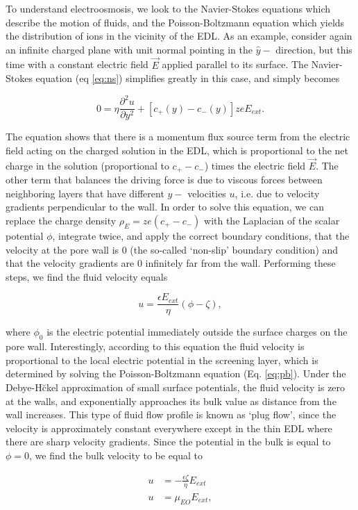 			To understand electroosmosis, we look to the Navier-Stokes equations which describe the motion of fluids, and the Poisson-Boltzmann equation which yields the distribution of ions in the vicinity of the EDL. As an example, consider again an infinite charged plane with unit normal pointing in the $\hat{y}-$ direction, but this time with a constant electric field $\vec{E}$ applied parallel to its surface. The Navier-Stokes equation (eq \ref{eq:ns}) simplifies greatly in this case, and simply becomes
			
			\[ 0 = \eta\frac{\partial^{2}u}{\partial y^{2}}+\left[c_{+}\left(y\right)-c_{-}\left(y\right)\right]zeE_{ext}. \]
			
			The equation shows that there is a momentum flux source term from the electric field acting on the charged solution in the EDL, which is proportional to the net charge in the solution (proportional to $c_{+}-c_{-}$) times the electric field $\vec{E}$. The other term that balances the driving force is due to viscous forces between neighboring layers that have different $y-$ velocities $u$, i.e. due to velocity gradients perpendicular to the wall. In order to solve this equation, we can replace the charge density $\rho_{E}=ze\left(c_{+}-c_{-}\right)$ with the Laplacian of the scalar potential $\phi$, integrate twice, and apply the correct boundary conditions, that the velocity at the pore wall is 0 (the so-called `non-slip' boundary condition) and that the velocity gradients are 0 infinitely far from the wall.  Performing these steps, we find the fluid velocity equals 
			
			\[ u=\frac{\epsilon E_{ext}}{\eta}\left(\phi-\zeta\right), \]
			
			where $\phi_{0}$ is the electric potential immediately outside the surface charges on the pore wall. Interestingly, according to this equation the fluid velocity is proportional to the local electric potential in the screening layer, which is determined by solving the Poisson-Boltzmann equation (Eq. \ref{eq:pb}). Under the Debye-H\u ckel approximation of small surface potentials, the fluid velocity is zero at the walls, and exponentially approaches its bulk value as distance from the wall increases. This type of fluid flow profile is known as `plug flow', since the velocity is approximately constant everywhere except in the thin EDL where there are sharp velocity gradients. Since the potential in the bulk is equal to $\phi=0$, we find the bulk velocity to be equal to 
			
			\begin{equation} \label{eq:hs}
				\begin{split}
					u &= -\frac{\epsilon\zeta}{\eta}E_{ext} \\
					u &= \mu_{EO}E_{ext},
				\end{split}
			\end{equation}
			
